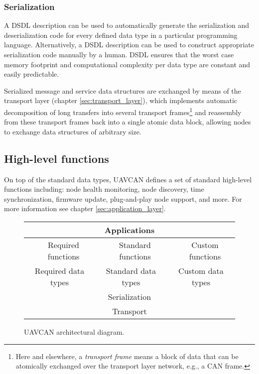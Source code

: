 \subsubsection{Serialization}

A DSDL description can be used to automatically generate the serialization and deserialization code
for every defined data type in a particular programming language.
Alternatively, a DSDL description can be used to construct appropriate serialization code manually by a human.
DSDL ensures that the worst case memory footprint and computational complexity per data type
are constant and easily predictable.

Serialized message and service data structures are exchanged by means of the transport
layer (chapter \ref{sec:transport_layer}), which implements automatic decomposition of
long transfers into several transport frames\footnote{Here and
elsewhere, a \emph{transport frame} means a block of data that can be atomically exchanged
over the transport layer network, e.g., a CAN frame.} and reassembly from these transport frames
back into a single atomic data block, allowing nodes to exchange data structures of
arbitrary size.

\subsection{High-level functions}

On top of the standard data types, UAVCAN defines a set of standard high-level functions including:
node health monitoring, node discovery, time synchronization, firmware update,
plug-and-play node support, and more.
For more information see chapter \ref{sec:application_layer}.

\begin{figure}[hbt]
    \centering
    \begin{tabular}{|c|c|l|c|l|c|}
        \hline
        \multicolumn{6}{|c|}{Applications} \\ \hline

        \qquad{} & Required functions &
        \qquad{} & Standard functions &
        \qquad{} & Custom functions \\
        \cline{2-2} \cline{4-4} \cline{6-6}

        \multicolumn{2}{|c|}{Required data types} &
        \multicolumn{2}{c|}{Standard data types} &
        \multicolumn{2}{c|}{Custom data types} \\ \hline

        \multicolumn{6}{|c|}{Serialization} \\ \hline

        \multicolumn{6}{|c|}{Transport} \\ \hline
    \end{tabular}
    \caption{UAVCAN architectural diagram.\label{fig:architecture}}
\end{figure}

